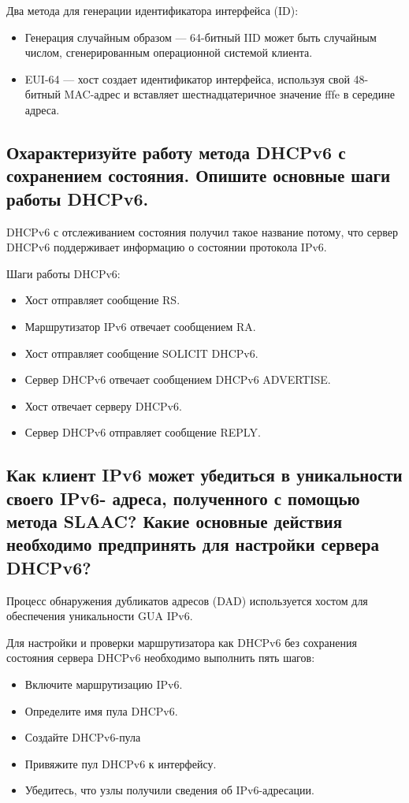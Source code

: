 Два метода для генерации идентификатора интерфейса (ID):
\begin{itemize}
	\item Генерация случайным образом --- 64-битный IID может быть 
		случайным числом, сгенерированным операционной системой 
		клиента.
	\item EUI-64 --- хост создает идентификатор интерфейса, используя 
		свой 48-битный MAC-адрес и вставляет шестнадцатеричное 
		значение fffe в середине адреса.
\end{itemize}

\subsection{Охарактеризуйте работу метода DHCPv6 с сохранением 
состояния. Опишите основные шаги работы DHCPv6.}
DHCPv6 с отслеживанием состояния получил такое название потому, 
что сервер DHCPv6 поддерживает информацию о состоянии протокола IPv6.

Шаги работы DHCPv6:
\begin{itemize}
	\item Хост отправляет сообщение RS.
	\item Маршрутизатор IPv6 отвечает сообщением RA.
	\item Хост отправляет сообщение SOLICIT DHCPv6.
	\item Сервер DHCPv6 отвечает сообщением DHCPv6 ADVERTISE.
	\item Хост отвечает серверу DHCPv6.
	\item Сервер DHCPv6 отправляет сообщение REPLY.
\end{itemize}

\subsection{Как клиент IPv6 может убедиться в уникальности своего IPv6-
адреса, полученного с помощью метода SLAAC? Какие 
основные действия необходимо предпринять для настройки 
сервера DHCPv6?}
Процесс обнаружения дубликатов адресов (DAD) используется хостом 
для обеспечения уникальности GUA IPv6. 

Для настройки и проверки маршрутизатора как DHCPv6 без 
сохранения состояния сервера DHCPv6 необходимо выполнить пять шагов:
\begin{itemize}
	\item Включите маршрутизацию IPv6.
	\item Определите имя пула DHCPv6.
	\item Создайте DHCPv6-пула
	\item Привяжите пул DHCPv6 к интерфейсу.
	\item Убедитесь, что узлы получили сведения об IPv6-адресации.
\end{itemize}

